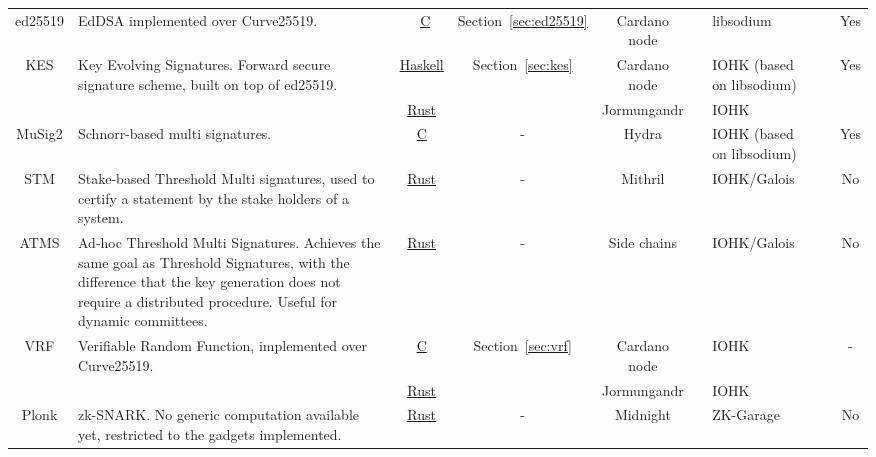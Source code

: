 \begin{landscape}
\begin{longtable}[c]{ c  p{7cm}  c  c  c  c  p{3cm}  c  c }
ed25519 & EdDSA implemented over Curve25519. & \
\href{https://github.com/jedisct1/libsodium/tree/master/src/libsodium/crypto_sign/ed25519}{C} & Section~\ref{sec:ed25519} &
Cardano node & \InProduction & libsodium &   & Yes\\
%
\hdashline
%
KES & Key Evolving Signatures. Forward secure signature scheme, built on top of ed25519. &
\href{https://github.com/input-output-hk/cardano-base/tree/master/cardano-crypto-class/src/Cardano/Crypto/KES}{Haskell}  &
Section~\ref{sec:kes} & Cardano node & \InProduction & IOHK (based on libsodium) &    & Yes \\
% 
& & \href{https://github.com/input-output-hk/chain-libs/tree/master/chain-crypto/src/algorithms/sumed25519}{Rust} & &
Jormungandr & \InProduction  & IOHK & & \\
%
\hdashline
%
MuSig2 & Schnorr-based multi signatures. &
\href{https://github.com/input-output-hk/musig2}{C} & - & Hydra & \Developing & IOHK (based on libsodium) &  & Yes\\
%
\hdashline
%
STM & Stake-based Threshold Multi signatures, used to certify a statement by the stake holders of a system. &
\href{https://github.com/input-output-hk/mithril}{Rust} & - & Mithril & \Developing &
IOHK/Galois &   & No \\
%
\hdashline
%
ATMS & Ad-hoc Threshold Multi Signatures. Achieves the same goal as Threshold Signatures,
with the difference that the key generation does not require a distributed procedure.
Useful for dynamic committees. & \href{https://github.com/input-output-hk/atms}{Rust} &
- & Side chains & \Developing & IOHK/Galois &   & No\\
%
\hdashline
%
 VRF & Verifiable Random Function, implemented over Curve25519. &
\href{https://github.com/input-output-hk/libsodium/tree/draft-irtf-cfrg-vrf-03/src/libsodium/crypto_vrf}{C} &
Section~\ref{sec:vrf} & Cardano node & \InProduction & IOHK &  & -\\
& & \href{https://github.com/input-output-hk/chain-libs/tree/master/chain-crypto/src/algorithms/vrf}{Rust} & &
Jormungandr & \InProduction & IOHK &  \\
%
\hdashline
%
Plonk & zk-SNARK. No generic computation available yet, restricted to the gadgets implemented. &
\href{https://github.com/ZK-Garage/plonk}{Rust} & - & Midnight & \Developing & ZK-Garage & & No
 \end{longtable}
\end{landscape}
\restoregeometry
